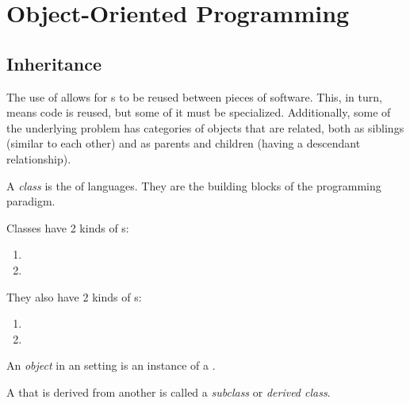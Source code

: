 \section{Object-Oriented Programming}\label{sec:Object_Oriented_Programming}



\subsection{Inheritance}\label{subsec:OOP_Inheritance}
The use of  allows for s to be reused between pieces of software.
This, in turn, means code is reused, but some of it must be specialized.
Additionally, some of the underlying problem has categories of objects that are related, both as siblings (similar to each other) and as parents and children (having a descendant relationship).

\begin{definition}[Class]\label{def:OOP_Class}
  A \emph{class} is the  of  languages.
  They are the building blocks of the programming paradigm.

  Classes have 2 kinds of s:
  \begin{enumerate}[noitemsep]
  \item {}
  \item {}
  \end{enumerate}

  They also have 2 kinds of s:
  \begin{enumerate}[noitemsep]
  \item {}
  \item {}
  \end{enumerate}
\end{definition}

\begin{definition}[Object]\label{def:OOP_Object}
  An \emph{object} in an  setting is an instance of a .
\end{definition}

\begin{definition}[Subclass]\label{def:OOP_Subclass}
  A  that is derived from another  is called a \emph{subclass} or \emph{derived class}.
\end{definition}

